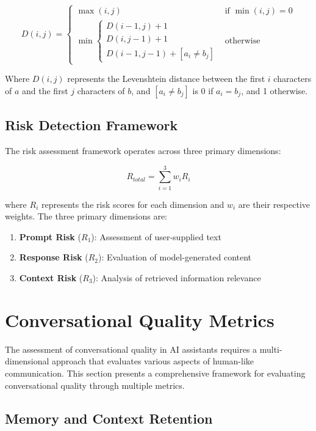 \documentclass[12pt]{article}
\begin{document}
\[
D(i, j) = 
\begin{cases}
\max(i, j) & \text{if } \min(i, j) = 0 \\
\min
\begin{cases}
D(i - 1, j) + 1 \\
D(i, j - 1) + 1 \\
D(i - 1, j - 1) + [a_i \ne b_j]
\end{cases} & \text{otherwise}
\end{cases}
\]

Where \( D(i, j) \) represents the Levenshtein distance between the first \( i \) characters of \( a \) and the first \( j \) characters of \( b \), and \([a_i \ne b_j]\) is 0 if \( a_i = b_j \), and 1 otherwise.

\subsection{Risk Detection Framework}

The risk assessment framework operates across three primary dimensions:

\begin{equation}
    R_{total} = \sum_{i=1}^{3} w_i R_i
\end{equation}

where $R_i$ represents the risk scores for each dimension and $w_i$ are their respective weights. The three primary dimensions are:

\begin{enumerate}
    \item \textbf{Prompt Risk} ($R_1$): Assessment of user-supplied text
    \item \textbf{Response Risk} ($R_2$): Evaluation of model-generated content
    \item \textbf{Context Risk} ($R_3$): Analysis of retrieved information relevance
\end{enumerate}

\section{Conversational Quality Metrics}

The assessment of conversational quality in AI assistants requires a multi-dimensional approach that evaluates various aspects of human-like communication. This section presents a comprehensive framework for evaluating conversational quality through multiple metrics.

\subsection{Memory and Context Retention}
\end{document}
